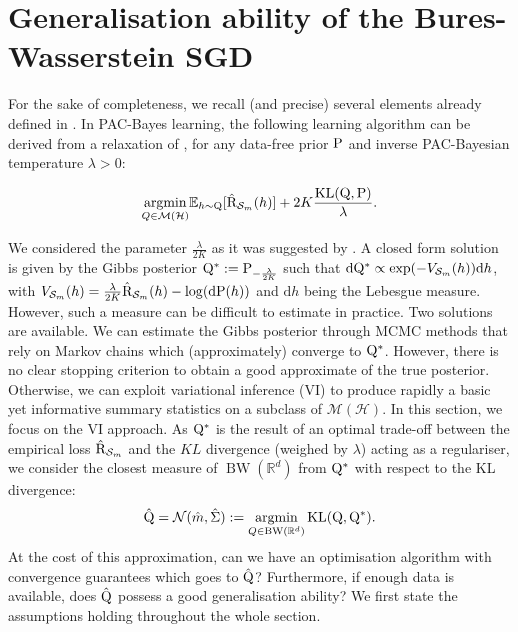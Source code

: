 \section{Generalisation ability of the Bures-Wasserstein SGD}

\label{sec: gene_sgd}

For the sake of completeness, we recall (and precise) several elements already defined in .
In PAC-Bayes learning, the following learning algorithm can be derived from a relaxation of \citet[][Theorem 1.2.6]{catoni2007pac}, for any data-free prior $\P$ and inverse PAC-Bayesian temperature $\lambda>0$:

\[ \underset{Q\in \mathcal{M}(\mathcal{H})}{\operatorname{argmin}} \mathbb{E}_{h\sim \Q}[\Riskhat_{\Sm}(h)] + 2K\frac{\operatorname{KL}(\Q,\P)}{\lambda}.  \]

\noindent We considered the parameter $\frac{\lambda}{2K}$ as it was suggested by .
A closed form solution is given by the Gibbs posterior $\Q^*:= \P_{-\frac{\lambda}{2K}}$ such that $\mathrm{d}\Q^* \propto \exp(-V_{\Sm}(h))\mathrm{d}h$, with $V_{\Sm}(h) = \frac{\lambda}{2K}\Riskhat_{\Sm}(h) - \log(\mathrm{d}\P(h))$ and $\mathrm{d}h$ being the Lebesgue measure.
However, such a measure can be difficult to estimate in practice. Two solutions are available. We can estimate the Gibbs posterior through MCMC methods that rely on Markov chains which (approximately) converge to $\Q^*$. However, there is no clear stopping criterion to obtain a good approximate of the true posterior. Otherwise, we can exploit variational inference (VI) to produce rapidly a basic yet informative summary statistics on a subclass of $\mathcal{M}(\mathcal{H})$.
In this section, we focus on the VI approach. As $\Q^*$ is the result of an optimal trade-off between the empirical loss $\Riskhat_{\Sm}$ and the $KL$ divergence (weighed by $\lambda$) acting as a regulariser, we consider the closest measure of $\operatorname{BW}(\mathbb{R}^d)$ from $\Q^*$ with respect to the KL divergence:
\[ \hat{\Q} = \mathcal{N}(\hat{m},\hat{\Sigma}) := \underset{Q\in \operatorname{BW}(\mathbb{R}^d)}{\operatorname{argmin}} \operatorname{KL}(\Q,\Q^*). \]
At the cost of this approximation, can we have an optimisation algorithm with convergence guarantees which goes to $\hat{\Q}$? Furthermore, if enough data is available, does $\hat{\Q}$ possess a good generalisation ability?
We first state the assumptions holding throughout the whole section.

